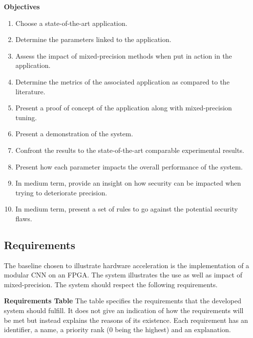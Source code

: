 \textbf{Objectives}

\begin{enumerate}
  \item Choose a state-of-the-art application.
  \item Determine the parameters linked to the application.
  \item Assess the impact of mixed-precision methods when put in action in the application.
  \item Determine the metrics of the associated application as compared to the literature.
  \item Present a proof of concept of the application along with mixed-precision tuning.
  \item Present a demonstration of the system.
  \item Confront the results to the state-of-the-art comparable experimental results.
  \item Present how each parameter impacts the overall performance of the system.
  \item In medium term, provide an insight on how security can be impacted when trying to deteriorate precision.
  \item In medium term, present a set of rules to go against the potential security flaws.
\end{enumerate}


\subsection{Requirements}

The baseline chosen to illustrate hardware acceleration is the implementation of a modular CNN on an FPGA. The system illustrates the use as well as impact of mixed-precision. The system should respect the following requirements.

\textbf{Requirements Table} The table specifies the requirements that the developed system should fulfill. It does not give an indication of how the requirements will be met but instead explains the reasons of its existence. Each requirement has an identifier, a name, a priority rank (0 being the highest) and an explanation.

